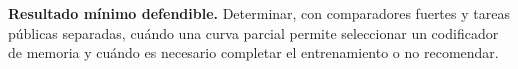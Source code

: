 \documentclass[11pt,letterpaper]{article}
\begin{document}
\noindent\textbf{Resultado mínimo defendible.}
Determinar, con comparadores fuertes y tareas públicas separadas, cuándo una curva parcial permite seleccionar un codificador de memoria y cuándo es necesario completar el entrenamiento o no recomendar.

\begingroup
\setlength{\bibitemsep}{0.15\baselineskip}
\setlength{\emergencystretch}{2em}
\printbibliography[title={Referencias}]
\endgroup
\end{document}
